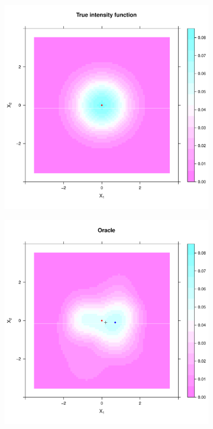 \begin{figure}[htbp]
    \centering
    \begin{subfigure}[t]{0.45\textwidth}
        \includegraphics[width=\textwidth]{output/true_intensity_heatmap}
        \label{fig:cases_heatmap:unif_100_1.0_1h:true}
    \end{subfigure}%
    \begin{subfigure}[t]{0.45\textwidth}
        \includegraphics[width=\textwidth]{output/oracle_intensity_heatmap}
        \label{fig:cases_heatmap:unif_100_1.0_1h:oracle}
    \end{subfigure}


\end{figure}
